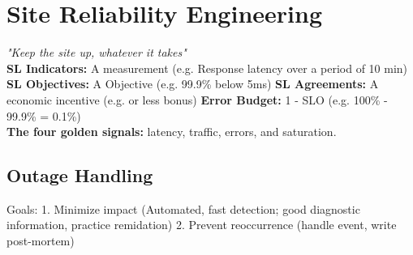 \section{Site Reliability Engineering}
\textit{"Keep the site up, whatever it takes"} \\
\textbf{SL Indicators:} A measurement (e.g. Response latency over a period of 10 min)
\textbf{SL Objectives:} A Objective (e.g. 99.9\% below 5ms)
\textbf{SL Agreements:} A economic incentive (e.g. or less bonus)
\textbf{Error Budget:} 1 - SLO (e.g. 100\% - 99.9\% = 0.1\%) \\

\textbf{The four golden signals: } latency, traffic, errors, and saturation.

\subsection{Outage Handling}
Goals: 1. Minimize impact (Automated, fast detection; good diagnostic information, practice remidation) 2. Prevent reoccurrence (handle event, write post-mortem)
